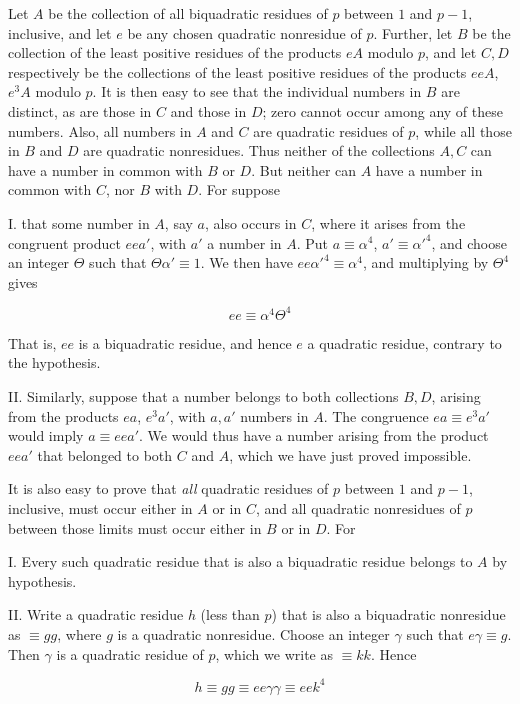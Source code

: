 Let $A$ be the collection of all biquadratic residues of $p$ between $1$ and $p-1$, inclusive, and let $e$ be any chosen quadratic nonresidue of $p$. Further, let $B$ be the collection of the least positive residues of the products $eA$ modulo $p$, and let $C,D$ respectively be the collections of the least positive residues of the products $eeA$, $e^3A$ modulo $p$. It is then easy to see that the individual numbers in $B$ are distinct, as are those in $C$ and those in $D$; zero cannot occur among any of these numbers. Also, all numbers in $A$ and $C$ are quadratic residues of $p$, while all those in $B$ and $D$ are quadratic nonresidues. Thus neither of the collections $A,C$ can have a number in common with $B$ or $D$. But neither can $A$ have a number in common with $C$, nor $B$ with $D$. For suppose

I. that some number in $A$, say $a$, also occurs in $C$, where it arises from the congruent product $eea'$, with $a'$ a number in $A$. Put $a\equiv\alpha^4$, $a'\equiv\alpha'^4$, and choose an integer $\Theta$ such that $\Theta\alpha'\equiv1$. We then have $ee\alpha'^4\equiv\alpha^4$, and multiplying by $\Theta^4$ gives

\[
ee\equiv\alpha^4\Theta^4
\]

That is, $ee$ is a biquadratic residue, and hence $e$ a quadratic residue, contrary to the hypothesis.

%
II. Similarly, suppose that a number belongs to both collections $B,D$, arising from the products $ea$, $e^3a'$, with $a,a'$ numbers in $A$. The congruence $ea\equiv e^3a'$ would imply $a\equiv eea'$. We would thus have a number arising from the product $eea'$ that belonged to both $C$ and $A$, which we have just proved impossible.

It is also easy to prove that \emph{all} quadratic residues of $p$ between $1$ and $p-1$, inclusive, must occur either in $A$ or in $C$, and all quadratic nonresidues of $p$ between those limits must occur either in $B$ or in $D$. For

I. Every such quadratic residue that is also a biquadratic residue belongs to $A$ by hypothesis.

II. Write a quadratic residue $h$ (less than $p$) that is also a biquadratic nonresidue as $\equiv gg$, where $g$ is a quadratic nonresidue. Choose an integer $\gamma$ such that $e\gamma\equiv g$. Then $\gamma$ is a quadratic residue of $p$, which we write as $\equiv kk$. Hence

\[
h\equiv gg\equiv ee\gamma\gamma\equiv eek^4
\]

